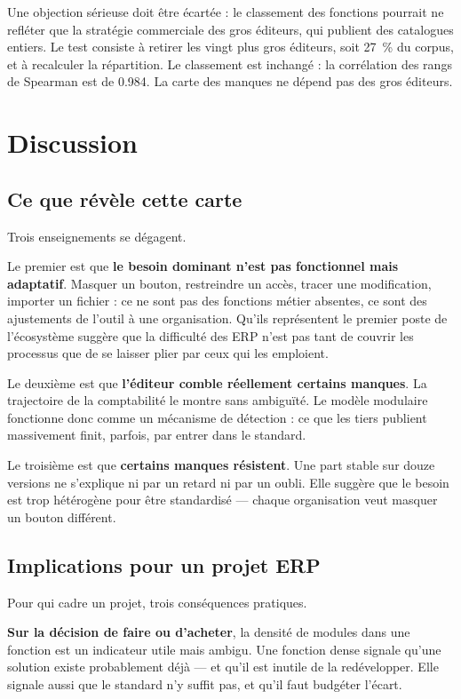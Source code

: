\documentclass[11pt,a4paper]{article}
\begin{document}
Une objection sérieuse doit être écartée : le classement des fonctions
pourrait ne refléter que la stratégie commerciale des gros éditeurs, qui
publient des catalogues entiers. Le test consiste à retirer les vingt plus gros
éditeurs, soit \SI{27}{\percent} du corpus, et à recalculer la répartition. Le
classement est inchangé : la corrélation des rangs de Spearman est de
\num{0.984}. La carte des manques ne dépend pas des gros éditeurs.

\section{Discussion}

\subsection{Ce que révèle cette carte}

Trois enseignements se dégagent.

Le premier est que \textbf{le besoin dominant n'est pas fonctionnel mais
adaptatif}. Masquer un bouton, restreindre un accès, tracer une modification,
importer un fichier : ce ne sont pas des fonctions métier absentes, ce sont des
ajustements de l'outil à une organisation. Qu'ils représentent le premier poste
de l'écosystème suggère que la difficulté des ERP n'est pas tant de couvrir les
processus que de se laisser plier par ceux qui les emploient.

Le deuxième est que \textbf{l'éditeur comble réellement certains manques}. La
trajectoire de la comptabilité le montre sans ambiguïté. Le modèle modulaire
fonctionne donc comme un mécanisme de détection : ce que les tiers publient
massivement finit, parfois, par entrer dans le standard.

Le troisième est que \textbf{certains manques résistent}. Une part stable sur
douze versions ne s'explique ni par un retard ni par un oubli. Elle suggère que
le besoin est trop hétérogène pour être standardisé --- chaque organisation veut
masquer un bouton différent.

\subsection{Implications pour un projet ERP}

Pour qui cadre un projet, trois conséquences pratiques.

\textbf{Sur la décision de faire ou d'acheter}, la densité de modules dans une
fonction est un indicateur utile mais ambigu. Une fonction dense signale qu'une
solution existe probablement déjà --- et qu'il est inutile de la redévelopper.
Elle signale aussi que le standard n'y suffit pas, et qu'il faut budgéter
l'écart.
\end{document}
